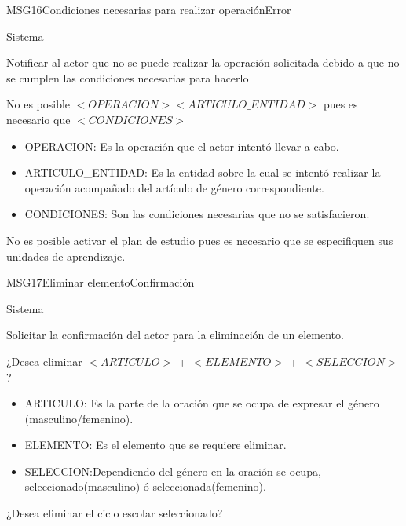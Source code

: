 \begin{mensaje}{MSG16}{Condiciones necesarias para realizar operación}{Error}
	\item[Canal:] Sistema
	\item[Propósito:] Notificar al actor que no se puede realizar la operación solicitada debido a que no se cumplen las condiciones necesarias para hacerlo
	\item[Redacción:] No es posible $<OPERACION> <ARTICULO\_ENTIDAD>$ pues es necesario que $<CONDICIONES>$
	\item[Parámetros:] 
	\begin{itemize}
		\item OPERACION: Es la operación que el actor intentó llevar a cabo.
		\item ARTICULO\_ENTIDAD: Es la entidad sobre la cual se intentó realizar la operación acompañado del artículo de género correspondiente.
		\item CONDICIONES: Son las condiciones necesarias que no se satisfacieron.
	\end{itemize}
	\item[Ejemplo:] No es posible activar el plan de estudio pues es necesario que se especifiquen sus unidades de aprendizaje.
	
	
\end{mensaje}

\begin{mensaje}{MSG17}{Eliminar elemento}{Confirmación}
	\item[Canal:] Sistema
	\item[Propósito:] Solicitar la confirmación del actor para la eliminación de un elemento.
	\item[Redacción:] ¿Desea eliminar $<ARTICULO>$ + $<ELEMENTO>$ + $<SELECCION>$?
	\item[Parámetros:] 
	\begin{itemize}
		\item ARTICULO: Es la parte de la oración que se ocupa de expresar el género (masculino/femenino).
		\item ELEMENTO: Es el elemento que se requiere eliminar.
		\item SELECCION:Dependiendo del género en la oración se ocupa, seleccionado(masculino)  ó seleccionada(femenino).
	\end{itemize}
	\item[Ejemplo:] ¿Desea eliminar el ciclo escolar seleccionado?
	
\end{mensaje}

